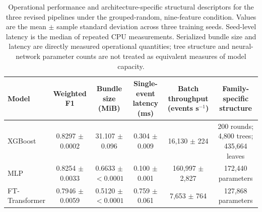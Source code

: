 \begin{table}[t]
\centering
\caption{Operational performance and architecture-specific structural descriptors for the three revised pipelines under the grouped-random, nine-feature condition. Values are the mean $\pm$ sample standard deviation across three training seeds. Seed-level latency is the median of repeated CPU measurements. Serialized bundle size and latency are directly measured operational quantities; tree structure and neural-network parameter counts are not treated as equivalent measures of model capacity.}
\label{tab:operational_complexity}
\begin{tabular}{lccccc}
Model & Weighted F1 & Bundle size (MiB) & Single-event latency (ms) & Batch throughput (events s$^{-1}$) & Family-specific structure \\
\hline
XGBoost & 0.8297 $\pm$ 0.0002 & 31.107 $\pm$ 0.096 & 0.304 $\pm$ 0.009 & 16,130 $\pm$ 224 & 200 rounds; 4,800 trees; 435,664 leaves \\
MLP & 0.8254 $\pm$ 0.0033 & 0.6633 $\pm$ $<0.0001$ & 0.100 $\pm$ 0.001 & 160,997 $\pm$ 2,827 & 172,440 parameters \\
FT-Transformer & 0.7946 $\pm$ 0.0059 & 0.5120 $\pm$ $<0.0001$ & 0.759 $\pm$ 0.061 & 7,653 $\pm$ 764 & 127,868 parameters \\
\hline
\end{tabular}
\end{table}
